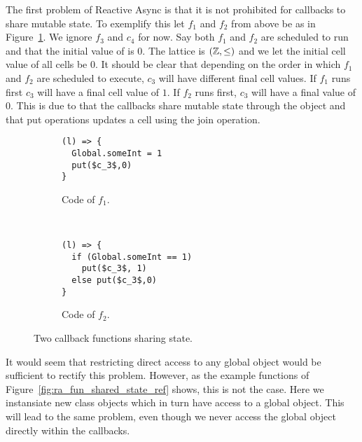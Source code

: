 The first problem of Reactive Async is that it is not prohibited for callbacks
to share mutable state. To exemplify this let $f_1$ and $f_2$ from above be as
in Figure~\ref{fig:ra_fun_shared_state}. We ignore $f_3$ and $c_4$ for now. 
Say both $f_1$ and $f_2$ are scheduled to run and that the initial value of
 is $0$.  The lattice is $(\mathbb{Z}, \leq)$ and we let the
initial cell value of all cells be $0$.  It should be clear that depending on
the order in which $f_1$ and $f_2$ are scheduled to execute, $c_3$ will have 
different final cell values. If $f_1$ runs first $c_3$ will have a final cell
value of $1$. If $f_2$ runs first, $c_3$ will have a final value of $0$. This is
due to that the callbacks share mutable state through the  object
and that put operations updates a cell using the join operation.

\begin{figure}
  \begin{subfigure}[b]{0.4\textwidth}
    \begin{lstlisting}
(l) => {
  Global.someInt = 1
  put($c_3$,0)
}
    \end{lstlisting}
    \caption{Code of $f_1$.}
  \end{subfigure}
  ~
  \begin{subfigure}[b]{0.4\textwidth}
    \begin{lstlisting}
(l) => {
  if (Global.someInt == 1)
    put($c_3$, 1)
  else put($c_3$,0)
}
    \end{lstlisting}
    \caption{Code of $f_2$.}
  \end{subfigure}
  \caption{Two callback functions sharing state.}
  \label{fig:ra_fun_shared_state}
\end{figure}

It would seem that restricting direct access to any global object would be
sufficient to rectify this problem. However, as the example functions of
Figure~\ref{fig:ra_fun_shared_state_ref} shows, this is not the case. Here we
instansiate new class objects which in turn have access to a global object. This
will lead to the same problem, even though we never access the global object
directly within the callbacks.

